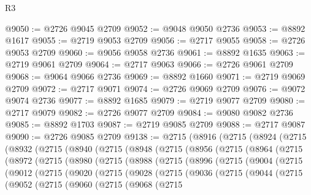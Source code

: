 \begin{lexlean}{R3}
\begin{coremodule}
@9050 := @2726 @9045 @2709
@9052 := @9048 @9050 @2736
@9053 := @8892 @1617
@9055 := @2719 @9053 @2709
@9056 := @2717 @9055
@9058 := @2726 @9053 @2709
@9060 := @9056 @9058 @2736
@9061 := @8892 @1635
@9063 := @2719 @9061 @2709
@9064 := @2717 @9063
@9066 := @2726 @9061 @2709
@9068 := @9064 @9066 @2736
@9069 := @8892 @1660
@9071 := @2719 @9069 @2709
@9072 := @2717 @9071
@9074 := @2726 @9069 @2709
@9076 := @9072 @9074 @2736
@9077 := @8892 @1685
@9079 := @2719 @9077 @2709
@9080 := @2717 @9079
@9082 := @2726 @9077 @2709
@9084 := @9080 @9082 @2736
@9085 := @8892 @1703
@9087 := @2719 @9085 @2709
@9088 := @2717 @9087
@9090 := @2726 @9085 @2709
@9138 := @2715
    (@8916
      (@2715
        (@8924
          (@2715
            (@8932
              (@2715
                (@8940
                  (@2715
                    (@8948
                      (@2715
                        (@8956
                          (@2715
                            (@8964
                              (@2715
                                (@8972
                                  (@2715
                                    (@8980
                                      (@2715
                                        (@8988
                                          (@2715
                                            (@8996
                                              (@2715
                                                (@9004
                                                  (@2715
                                                    (@9012
                                                      (@2715
                                                        (@9020
                                                          (@2715
                                                            (@9028
                                                              (@2715
                                                                (@9036
                                                                  (@2715
                                                                    (@9044
                                                                      (@2715
                                                                        (@9052
                                                                          (@2715
                                                                            (@9060
                                                                              (@2715
                                                                                (@9068
                                                                                  (@2715

\end{coremodule}
\end{lexlean}
